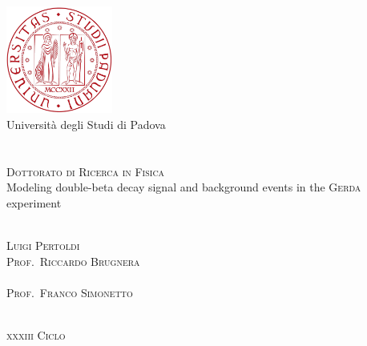 
\begin{titlepage}
  \thispagestyle{empty}
  \begin{center}
  \includegraphics[width=3.5cm]{img/unipd-logo.pdf} \\
  \vspace{0.5cm}
  {\Large Universit\`a degli Studi di Padova} \\
  \hrulefill \\
   \\
  \vspace{2cm}
  \textsc{\large Dottorato di Ricerca in Fisica} \\
  \vspace{3cm}
  \huge{%
    Modeling double-beta decay signal and background events in the
    \textsc{Gerda} experiment%
  }
  \end{center}
  \vspace{3cm}
  \begin{multicols}{2}
  \large
  \noindent
   \\
  \textsc{Luigi Pertoldi}
  \columnbreak
  \flushright
   \\
  \textsc{Prof.~Riccardo Brugnera} \\
  \vspace{12mm}
   \\
  \textsc{Prof.~Franco Simonetto}
  \end{multicols}
  \vspace*{\fill}
  \begin{center}
  \hrulefill \\
  \textsc{\textsc{xxxiii} Ciclo}
  \end{center}
\end{titlepage}
\restoregeometry
